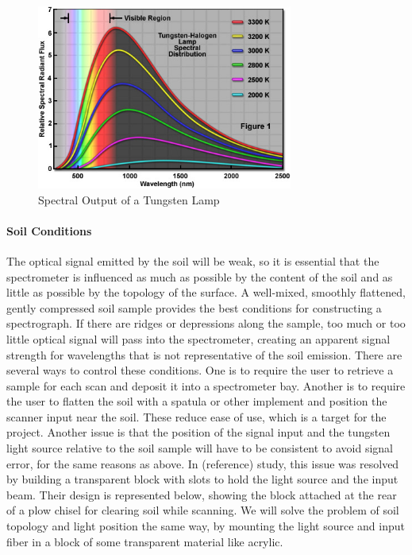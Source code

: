 \begin{figure}[H]
    \caption{Spectral Output of a Tungsten Lamp}
    \centering
    \includegraphics[width=0.75\textwidth]{images/TungstenLamp.jpg}
\end{figure}

\paragraph{Soil Conditions} The optical signal emitted by the soil will be weak, so it is essential that the spectrometer is influenced as much as possible by the content of the soil and as little as possible by the topology of the surface. A well-mixed, smoothly flattened, gently compressed soil sample provides the best conditions for constructing a spectrograph. If there are ridges or depressions along the sample, too much or too little optical signal will pass into the spectrometer, creating an apparent signal strength for wavelengths that is not representative of the soil emission. There are several ways to control these conditions. One is to require the user to retrieve a sample for each scan and deposit it into a spectrometer bay. Another is to require the user to flatten the soil with a spatula or other implement and position the scanner input near the soil. These reduce ease of use, which is a target for the project. Another issue is that the position of the signal input and the tungsten light source relative to the soil sample will have to be consistent to avoid signal error, for the same reasons as above. In (reference) study, this issue was resolved by building a transparent block with slots to hold the light source and the input beam. Their design is represented below, showing the block attached at the rear of a plow chisel for clearing soil while scanning. We will solve the problem of soil topology and light position the same way, by mounting the light source and input fiber in a block of some transparent material like acrylic.

